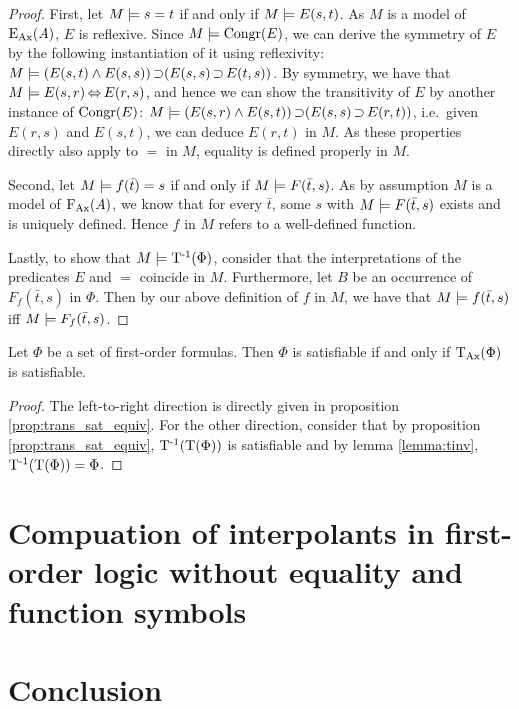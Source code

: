 \begin{proof}
	First, let $M\models s = t$ if and only if $M\models E(s, t)$.
	As $M$ is a model of $\operatorname{E_{Ax}}(A)$, $E$ is reflexive. 
	Since $M \models \operatorname{Congr}(E)$, we can derive the symmetry of $E$ by the following instantiation of it using reflexivity:
	$M \entails (E(s, t) \land E(s, s)) \limpl ( E(s, s) \limpl\nolinebreak E(t, s))$.
	By symmetry, we have that $M \models E(s, r) \operatorname{\Leftrightarrow} E(r, s)$, and hence we can show the transitivity of $E$ by another instance of $\operatorname{Congr}(E)$: 
	$M \entails (E(s, r) \land E(s, t)) \limpl ( E(s, s) \limpl\nolinebreak E(r, t))$, i.e.\ given $E(r, s)$ and $E(s, t)$, we can deduce $E(r, t)$ in $M$.
	As these properties directly also apply to $=$ in $M$, equality is defined properly in $M$.

	Second, let $M\models f(\bar t) = s$ if and only if $M\models F(\bar t, s)$.
	As by assumption $M$ is a model of $\operatorname{F_{Ax}}(A)$, we know that for every $\bar t$, some $s$ with $M\models F(\bar t, s)$ exists and is uniquely defined.
	Hence $f$ in $M$ refers to a well-defined function.

	Lastly, to show that $M \models \operatorname{T^{-1}}(\Phi)$, 
	consider that the interpretations of the predicates $E$ and $=$ coincide in $M$.
	Furthermore, let $B$ be an occurrence of $F_f(\bar t, s)$ in $\Phi$.
	Then by our above definition of $f$ in $M$, we have that $M \models f(\bar t, s)$ iff $M \models F_f(\bar t, s)$.
\end{proof}

\begin{corr}
	Let $\Phi$ be a set of first-order formulas.
	Then $\Phi$ is satisfiable if and only if $\operatorname{\operatorname{T}_{Ax}}(\Phi)$ is satisfiable.
\end{corr}
\begin{proof}
	The left-to-right direction is directly given in proposition \ref{prop:trans_sat_equiv}.
	For the other direction, consider that by proposition \ref{prop:trans_sat_equiv}, $\operatorname{T^{-1}}(\operatorname{T}(\Phi))$ is satisfiable and by lemma \ref{lemma:tinv}, $\operatorname{T^{-1}}(\operatorname{T}(\Phi)) = \Phi$.
\end{proof}



\section{Compuation of interpolants in first-order logic without equality and function symbols}


\section{Conclusion}

